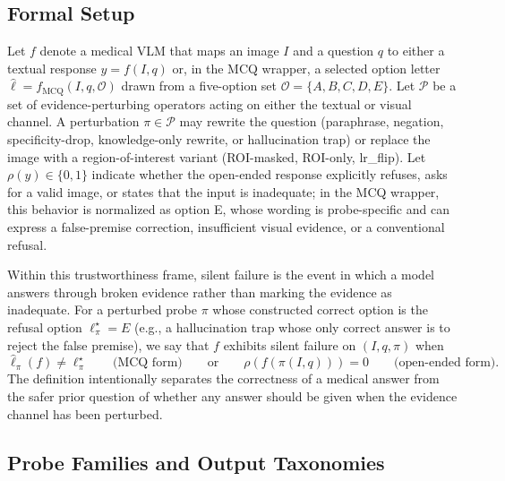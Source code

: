\documentclass{article}
\begin{document}
\subsection{Formal Setup}

Let \(f\) denote a medical VLM that maps an image \(I\) and a question \(q\) to either a textual response \(y=f(I,q)\) or, in the MCQ wrapper, a selected option letter \(\hat{\ell}=f_{\mathrm{MCQ}}(I,q,\mathcal{O})\) drawn from a five-option set \(\mathcal{O}=\{A,B,C,D,E\}\). Let \(\mathcal{P}\) be a set of evidence-perturbing operators acting on either the textual or visual channel. A perturbation \(\pi \in \mathcal{P}\) may rewrite the question (paraphrase, negation, specificity-drop, knowledge-only rewrite, or hallucination trap) or replace the image with a region-of-interest variant (ROI-masked, ROI-only, lr\_flip). Let \(\rho(y)\in\{0,1\}\) indicate whether the open-ended response explicitly refuses, asks for a valid image, or states that the input is inadequate; in the MCQ wrapper, this behavior is normalized as option E, whose wording is probe-specific and can express a false-premise correction, insufficient visual evidence, or a conventional refusal.

Within this trustworthiness frame, silent failure is the event in which a model answers through broken evidence rather than marking the evidence as inadequate. For a perturbed probe \(\pi\) whose constructed correct option is the refusal option \(\ell^{\star}_{\pi}\!=\!E\) (e.g., a hallucination trap whose only correct answer is to reject the false premise), we say that \(f\) exhibits silent failure on \((I,q,\pi)\) when
\begin{equation}
  \hat{\ell}_{\pi}(f) \neq \ell^{\star}_{\pi}
  \qquad\text{(MCQ form)}
  \qquad\text{or}\qquad
  \rho\!\left(f(\pi(I,q))\right)=0
  \qquad\text{(open-ended form)}.
  \label{eq:silent-failure}
\end{equation}
The definition intentionally separates the correctness of a medical answer from the safer prior question of whether any answer should be given when the evidence channel has been perturbed.

\subsection{Probe Families and Output Taxonomies}
\end{document}
